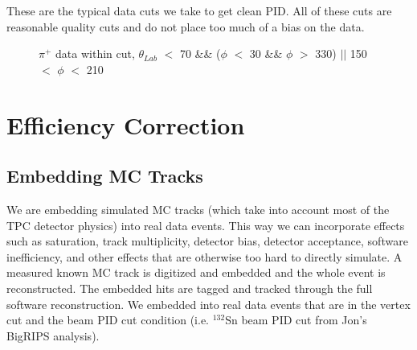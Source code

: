 \documentclass[12pt, letterpaper, twoside]{article}
\begin{document}
These are the typical data cuts we take to get clean PID. All of these cuts are reasonable quality cuts and do not place too much of a bias on the data. 
 

 
 \begin{figure}
\begin{adjustbox}{max width=1.2\linewidth,center}
\centering
{}%
%
\end{adjustbox}
\label{fig:data}
 \caption{$\pi^+$ data within cut, $\theta_{Lab}$ $<$ 70 \&\& ($\phi$ $<$ 30 \&\& $\phi$ $>$ 330) $||$ 150 $<$ $\phi$ $<$ 210 }
 \label{fig:data}
\end{figure}
 
 \section{Efficiency Correction}
 \subsection{Embedding MC Tracks}
 We are embedding simulated MC tracks (which take into account most of the TPC detector physics) into real data events. This way we can incorporate effects such as saturation, track multiplicity, detector bias, detector acceptance, software inefficiency, and other effects that are otherwise too hard to directly simulate. A measured known MC track is digitized and embedded and the whole event is reconstructed. The embedded hits are tagged and tracked through the full software reconstruction. We embedded into real data events that are in the vertex cut and the beam PID cut condition (i.e. ${}^{132}$Sn beam PID cut from Jon's BigRIPS analysis).
 
\end{document}
